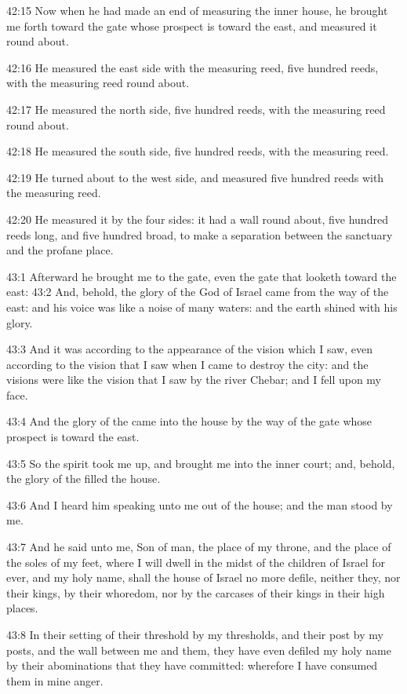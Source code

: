 42:15 Now when he had made an end of measuring the inner house, he
brought me forth toward the gate whose prospect is toward the east,
and measured it round about.

42:16 He measured the east side with the measuring reed, five hundred
reeds, with the measuring reed round about.

42:17 He measured the north side, five hundred reeds, with the
measuring reed round about.

42:18 He measured the south side, five hundred reeds, with the
measuring reed.

42:19 He turned about to the west side, and measured five hundred
reeds with the measuring reed.

42:20 He measured it by the four sides: it had a wall round about,
five hundred reeds long, and five hundred broad, to make a separation
between the sanctuary and the profane place.

43:1 Afterward he brought me to the gate, even the gate that looketh
toward the east: 43:2 And, behold, the glory of the God of Israel came
from the way of the east: and his voice was like a noise of many
waters: and the earth shined with his glory.

43:3 And it was according to the appearance of the vision which I saw,
even according to the vision that I saw when I came to destroy the
city: and the visions were like the vision that I saw by the river
Chebar; and I fell upon my face.

43:4 And the glory of the \LORD came into the house by the way of the
gate whose prospect is toward the east.

43:5 So the spirit took me up, and brought me into the inner court;
and, behold, the glory of the \LORD filled the house.

43:6 And I heard him speaking unto me out of the house; and the man
stood by me.

43:7 And he said unto me, Son of man, the place of my throne, and the
place of the soles of my feet, where I will dwell in the midst of the
children of Israel for ever, and my holy name, shall the house of
Israel no more defile, neither they, nor their kings, by their
whoredom, nor by the carcases of their kings in their high places.

43:8 In their setting of their threshold by my thresholds, and their
post by my posts, and the wall between me and them, they have even
defiled my holy name by their abominations that they have committed:
wherefore I have consumed them in mine anger.

